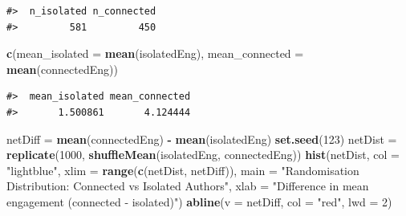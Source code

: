 \documentclass[
  10pt,
]{article}
\newenvironment{Shaded}{\begin{snugshade}}{\end{snugshade}}
\newcommand{\AttributeTok}[1]{\textcolor[rgb]{0.13,0.29,0.53}{#1}}
\newcommand{\DecValTok}[1]{\textcolor[rgb]{0.00,0.00,0.81}{#1}}
\newcommand{\FunctionTok}[1]{\textcolor[rgb]{0.13,0.29,0.53}{\textbf{#1}}}
\newcommand{\NormalTok}[1]{#1}
\newcommand{\OtherTok}[1]{\textcolor[rgb]{0.56,0.35,0.01}{#1}}
\newcommand{\SpecialCharTok}[1]{\textcolor[rgb]{0.81,0.36,0.00}{\textbf{#1}}}
\newcommand{\StringTok}[1]{\textcolor[rgb]{0.31,0.60,0.02}{#1}}
\begin{document}
\begin{Shaded}
\end{Shaded}

\begin{verbatim}
#>  n_isolated n_connected 
#>         581         450
\end{verbatim}

\begin{Shaded}
\begin{Highlighting}[]
\FunctionTok{c}\NormalTok{(}\AttributeTok{mean\_isolated =} \FunctionTok{mean}\NormalTok{(isolatedEng), }\AttributeTok{mean\_connected =} \FunctionTok{mean}\NormalTok{(connectedEng))}
\end{Highlighting}
\end{Shaded}

\begin{verbatim}
#>  mean_isolated mean_connected 
#>       1.500861       4.124444
\end{verbatim}

\begin{Shaded}
\begin{Highlighting}[]
\NormalTok{netDiff }\OtherTok{=} \FunctionTok{mean}\NormalTok{(connectedEng) }\SpecialCharTok{{-}} \FunctionTok{mean}\NormalTok{(isolatedEng)}
\FunctionTok{set.seed}\NormalTok{(}\DecValTok{123}\NormalTok{)}
\NormalTok{netDist }\OtherTok{=} \FunctionTok{replicate}\NormalTok{(}\DecValTok{1000}\NormalTok{, }\FunctionTok{shuffleMean}\NormalTok{(isolatedEng, connectedEng))}
\FunctionTok{hist}\NormalTok{(netDist, }\AttributeTok{col =} \StringTok{"lightblue"}\NormalTok{, }\AttributeTok{xlim =} \FunctionTok{range}\NormalTok{(}\FunctionTok{c}\NormalTok{(netDist, netDiff)),}
     \AttributeTok{main =} \StringTok{"Randomisation Distribution: Connected vs Isolated Authors"}\NormalTok{,}
     \AttributeTok{xlab =} \StringTok{"Difference in mean engagement (connected {-} isolated)"}\NormalTok{)}
\FunctionTok{abline}\NormalTok{(}\AttributeTok{v =}\NormalTok{ netDiff, }\AttributeTok{col =} \StringTok{"red"}\NormalTok{, }\AttributeTok{lwd =} \DecValTok{2}\NormalTok{)}
\end{Highlighting}
\end{Shaded}
\end{document}
